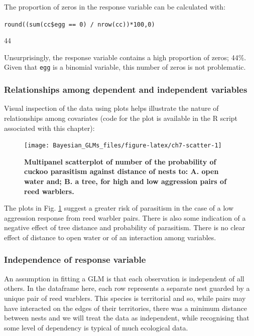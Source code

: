 \documentclass[
]{book}
\begin{document}
The proportion of zeros in the response variable can be calculated with:

\texttt{round((sum(cc\$egg\ ==\ 0)\ /\ nrow(cc))*100,0)}

44

Unsurprisingly, the response variable contains a high proportion of zeros; 44\%. Given that \texttt{egg} is a binomial variable, this number of zeros is not problematic.

\hypertarget{bern-rels}{%
\subsubsection{Relationships among dependent and independent variables}\label{bern-rels}}

Visual inspection of the data using plots helps illustrate the nature of relationships among covariates (code for the plot is available in the R script associated with this chapter):



\begin{figure}

{\centering \texttt{[image: Bayesian\_GLMs\_files/figure-latex/ch7-scatter-1]} 

}

\caption{\textbf{Multipanel scatterplot of number of the probability of cuckoo parasitism against distance of nests to: A. open water and; B. a tree, for high and low aggression pairs of reed warblers.}}\label{fig:ch7-scatter}
\end{figure}

The plots in Fig. \ref{fig:ch7-scatter} suggest a greater risk of parasitism in the case of a low aggression response from reed warbler pairs. There is also some indication of a negative effect of tree distance and probability of parasitism. There is no clear effect of distance to open water or of an interaction among variables.

\hypertarget{bern-depend}{%
\subsubsection{Independence of response variable}\label{bern-depend}}

An assumption in fitting a GLM is that each observation is independent of all others. In the dataframe here, each row represents a separate nest guarded by a unique pair of reed warblers. This species is territorial and so, while pairs may have interacted on the edges of their territories, there was a minimum distance between nests and we will treat the data as independent, while recognising that some level of dependency is typical of much ecological data.
\end{document}
